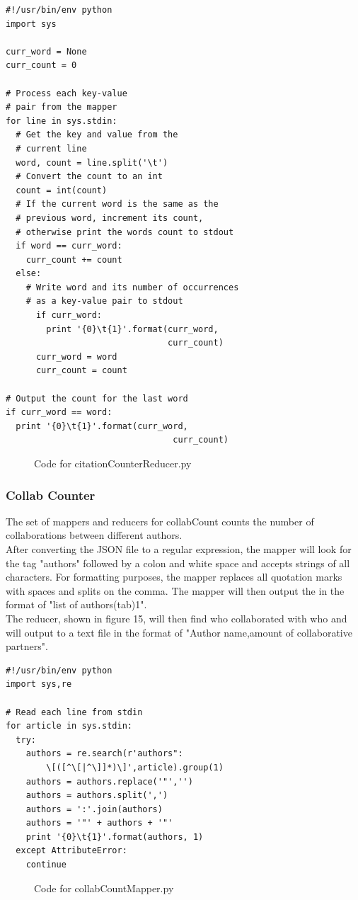 \documentclass[10pt,journal,compsoc]{IEEEtran}
\begin{document}
\begin{verbatim}
#!/usr/bin/env python
import sys

curr_word = None
curr_count = 0

# Process each key-value
# pair from the mapper
for line in sys.stdin:
  # Get the key and value from the 
  # current line
  word, count = line.split('\t')
  # Convert the count to an int
  count = int(count)
  # If the current word is the same as the 
  # previous word, increment its count, 
  # otherwise print the words count to stdout
  if word == curr_word:
    curr_count += count
  else:
    # Write word and its number of occurrences 
    # as a key-value pair to stdout
      if curr_word:
        print '{0}\t{1}'.format(curr_word,
                                curr_count)
      curr_word = word
      curr_count = count

# Output the count for the last word
if curr_word == word:
  print '{0}\t{1}'.format(curr_word, 
                                 curr_count)

\end{verbatim}
\begin{figure}[htp]
\centering
\caption{Code for citationCounterReducer.py}
\label{fig:}
\end{figure}

\subsubsection{Collab Counter}
The set of mappers and reducers for collabCount counts the number of collaborations between different authors.\\
\indent After converting the JSON file to a regular expression, the mapper will look for the tag "authors" followed by a colon and white space and accepts strings of all characters. For formatting purposes, the mapper replaces all quotation marks with spaces and splits on the comma. The mapper will then output the in the format of "list of authors(tab)1".\\
\indent The reducer, shown in figure 15, will then find who collaborated with who and will output to a text file in the format of "Author name,amount of collaborative partners".

\begin{verbatim}
#!/usr/bin/env python
import sys,re

# Read each line from stdin
for article in sys.stdin:
  try:
    authors = re.search(r'authors": 
        \[([^\[|^\]]*)\]',article).group(1)
    authors = authors.replace('"','')
    authors = authors.split(',')
    authors = ':'.join(authors)
    authors = '"' + authors + '"'
    print '{0}\t{1}'.format(authors, 1)
  except AttributeError:
    continue
\end{verbatim}
\begin{figure}[htp]
\centering
\caption{Code for collabCountMapper.py}
\label{fig:}
\end{figure}
\end{document}
